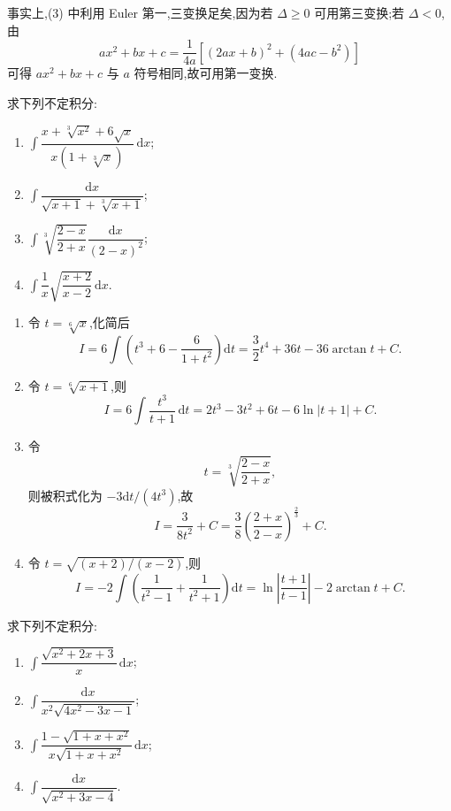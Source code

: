\begin{remark}
    事实上,(3) 中利用 Euler 第一,三变换足矣,因为若 $\Delta\geq0$ 可用第三变换;若 $\Delta<0$,由
    \[
        ax^2+bx+c=\dfrac{1}{4a}\left[(2ax+b)^2+(4ac-b^2)\right]
    \]
    可得 $ax^2+bx+c$ 与 $a$ 符号相同,故可用第一变换.
\end{remark}

\begin{example}
    求下列不定积分:
    \begin{enumerate}
        \item $\displaystyle\int\dfrac{x+\sqrt[3]{x^2}+6\sqrt{x}}{x(1+\sqrt[3]{x})}\,\mathrm{d}x$;
        \item $\displaystyle\int\dfrac{\mathrm{d}x}{\sqrt{x+1}+\sqrt[3]{x+1}}$;
        \item $\displaystyle\int\sqrt[3]{\dfrac{2-x}{2+x}}\dfrac{\mathrm{d}x}{(2-x)^2}$;
        \item $\displaystyle\int\dfrac{1}{x}\sqrt{\dfrac{x+2}{x-2}}\,\mathrm{d}x$.
    \end{enumerate}
\end{example}
\exampleblank

\begin{solution}
    \leavevmode
    \begin{enumerate}
        \item 令 $t=\sqrt[6]{x}$,化简后
              \[
                  I=6\int\left(t^3+6-\dfrac{6}{1+t^2}\right)\mathrm{d}t
                  =\dfrac{3}{2}t^4+36t-36\arctan t+C.
              \]
        \item 令 $t=\sqrt[6]{x+1}$,则
              \[
                  I=6\int\dfrac{t^3}{t+1}\,\mathrm{d}t
                  =2t^3-3t^2+6t-6\ln|t+1|+C.
              \]
        \item 令
              \[
                  t=\sqrt[3]{\dfrac{2-x}{2+x}},
              \]
              则被积式化为 $-3\mathrm{d}t/(4t^3)$,故
              \[
                  I=\dfrac{3}{8t^2}+C
                  =\dfrac{3}{8}\left(\dfrac{2+x}{2-x}\right)^{\frac{2}{3}}+C.
              \]
        \item 令 $t=\sqrt{(x+2)/(x-2)}$,则
              \[
                  I=-2\int\left(\dfrac{1}{t^2-1}+\dfrac{1}{t^2+1}\right)\mathrm{d}t
                  =\ln\left|\dfrac{t+1}{t-1}\right|-2\arctan t+C.
              \]
    \end{enumerate}
\end{solution}

\begin{example}
    求下列不定积分:
    \begin{enumerate}
        \item $\displaystyle\int\dfrac{\sqrt{x^2+2x+3}}{x}\,\mathrm{d}x$;
        \item $\displaystyle\int\dfrac{\mathrm{d}x}{x^2\sqrt{4x^2-3x-1}}$;
        \item $\displaystyle\int\dfrac{1-\sqrt{1+x+x^2}}{x\sqrt{1+x+x^2}}\,\mathrm{d}x$;
        \item $\displaystyle\int\dfrac{\mathrm{d}x}{\sqrt{x^2+3x-4}}$.
    \end{enumerate}
\end{example}
\exampleblank


